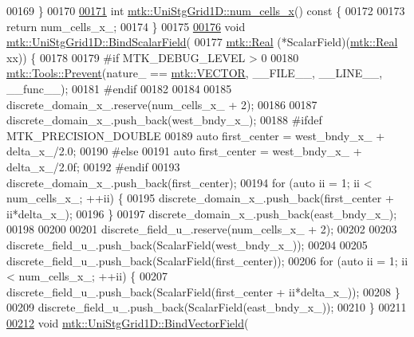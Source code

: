 \begin{DoxyCode}
00169 \}
00170 
\hypertarget{mtk__uni__stg__grid__1d_8cc_source_l00171}{}\hyperlink{classmtk_1_1UniStgGrid1D_af1b3729d8afa07be5b2775ed68015b80}{00171} \textcolor{keywordtype}{int} \hyperlink{classmtk_1_1UniStgGrid1D_af1b3729d8afa07be5b2775ed68015b80}{mtk::UniStgGrid1D::num\_cells\_x}()\textcolor{keyword}{ const }\{
00172 
00173   \textcolor{keywordflow}{return} num\_cells\_x\_;
00174 \}
00175 
\hypertarget{mtk__uni__stg__grid__1d_8cc_source_l00176}{}\hyperlink{classmtk_1_1UniStgGrid1D_a438cda229830d0e2f35c615e70b59a76}{00176} \textcolor{keywordtype}{void} \hyperlink{classmtk_1_1UniStgGrid1D_a438cda229830d0e2f35c615e70b59a76}{mtk::UniStgGrid1D::BindScalarField}(
00177     \hyperlink{group__c01-roots_gac080bbbf5cbb5502c9f00405f894857d}{mtk::Real} (*ScalarField)(\hyperlink{group__c01-roots_gac080bbbf5cbb5502c9f00405f894857d}{mtk::Real} xx)) \{
00178 
00179 \textcolor{preprocessor}{  #if MTK\_DEBUG\_LEVEL > 0}
00180   \hyperlink{classmtk_1_1Tools_a332324c6f25e66be9dff48c5987a3b9f}{mtk::Tools::Prevent}(nature\_ == \hyperlink{namespacemtk_ga4c54f2a329cfb4e56213b02a259d19e2a3d8cb27a993651a74d67fb8c98ae91b2}{mtk::VECTOR}, \_\_FILE\_\_, \_\_LINE\_\_, \_\_func\_\_);
00181 \textcolor{preprocessor}{  #endif}
00182 
00184 
00185   discrete\_domain\_x\_.reserve(num\_cells\_x\_ + 2);
00186 
00187   discrete\_domain\_x\_.push\_back(west\_bndy\_x\_);
00188 \textcolor{preprocessor}{  #ifdef MTK\_PRECISION\_DOUBLE}
00189   \textcolor{keyword}{auto} first\_center = west\_bndy\_x\_ + delta\_x\_/2.0;
00190 \textcolor{preprocessor}{  #else}
00191   \textcolor{keyword}{auto} first\_center = west\_bndy\_x\_ + delta\_x\_/2.0f;
00192 \textcolor{preprocessor}{  #endif}
00193   discrete\_domain\_x\_.push\_back(first\_center);
00194   \textcolor{keywordflow}{for} (\textcolor{keyword}{auto} ii = 1; ii < num\_cells\_x\_; ++ii) \{
00195     discrete\_domain\_x\_.push\_back(first\_center + ii*delta\_x\_);
00196   \}
00197   discrete\_domain\_x\_.push\_back(east\_bndy\_x\_);
00198 
00200 
00201   discrete\_field\_u\_.reserve(num\_cells\_x\_ + 2);
00202 
00203   discrete\_field\_u\_.push\_back(ScalarField(west\_bndy\_x\_));
00204 
00205   discrete\_field\_u\_.push\_back(ScalarField(first\_center));
00206   \textcolor{keywordflow}{for} (\textcolor{keyword}{auto} ii = 1; ii < num\_cells\_x\_; ++ii) \{
00207     discrete\_field\_u\_.push\_back(ScalarField(first\_center + ii*delta\_x\_));
00208   \}
00209   discrete\_field\_u\_.push\_back(ScalarField(east\_bndy\_x\_));
00210 \}
00211 
\hypertarget{mtk__uni__stg__grid__1d_8cc_source_l00212}{}\hyperlink{classmtk_1_1UniStgGrid1D_a5703f1f875f52f6de8f7db5a6250fafa}{00212} \textcolor{keywordtype}{void} \hyperlink{classmtk_1_1UniStgGrid1D_a5703f1f875f52f6de8f7db5a6250fafa}{mtk::UniStgGrid1D::BindVectorField}(

\end{DoxyCode}
